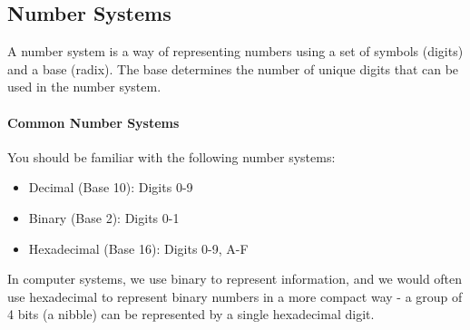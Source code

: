 \documentclass[11pt]{report}
\begin{document}
\subsection{Number Systems}
\begin{definition}
    A number system is a way of representing numbers using a set of symbols (digits) and a base (radix). The base determines the number of unique digits that can be used in the number system.
\end{definition}

\paragraph{Common Number Systems} You should be familiar with the following number systems:
\begin{itemize}
    \item Decimal (Base 10): Digits 0-9
    \item Binary (Base 2): Digits 0-1
    \item Hexadecimal (Base 16): Digits 0-9, A-F
\end{itemize}

In computer systems, we use binary to represent information, and we would often use hexadecimal to represent binary numbers in a more compact way - a group of 4 bits (a nibble) can be represented by a single hexadecimal digit.
\end{document}

